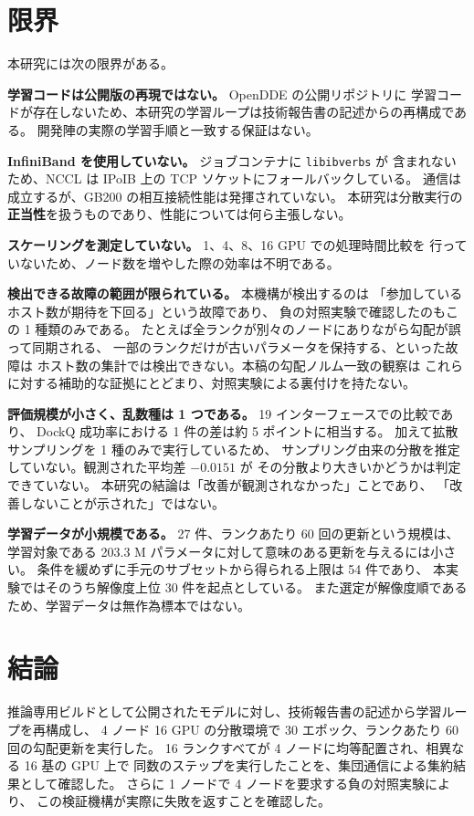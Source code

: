 \documentclass[11pt,a4paper]{article}
\begin{document}
\section{限界}

本研究には次の限界がある。

\textbf{学習コードは公開版の再現ではない。} OpenDDE の公開リポジトリに
学習コードが存在しないため、本研究の学習ループは技術報告書の記述からの再構成である。
開発陣の実際の学習手順と一致する保証はない。

\textbf{InfiniBand を使用していない。} ジョブコンテナに \texttt{libibverbs} が
含まれないため、NCCL は IPoIB 上の TCP ソケットにフォールバックしている。
通信は成立するが、GB200 の相互接続性能は発揮されていない。
本研究は分散実行の\textbf{正当性}を扱うものであり、性能については何ら主張しない。

\textbf{スケーリングを測定していない。} 1、4、8、16 GPU での処理時間比較を
行っていないため、ノード数を増やした際の効率は不明である。

\textbf{検出できる故障の範囲が限られている。} 本機構が検出するのは
「参加しているホスト数が期待を下回る」という故障であり、
負の対照実験で確認したのもこの 1 種類のみである。
たとえば全ランクが別々のノードにありながら勾配が誤って同期される、
一部のランクだけが古いパラメータを保持する、といった故障は
ホスト数の集計では検出できない。本稿の勾配ノルム一致の観察は
これらに対する補助的な証拠にとどまり、対照実験による裏付けを持たない。

\textbf{評価規模が小さく、乱数種は 1 つである。} 19 インターフェースでの比較であり、
DockQ 成功率における 1 件の差は約 5 ポイントに相当する。
加えて拡散サンプリングを 1 種のみで実行しているため、
サンプリング由来の分散を推定していない。観測された平均差 $-0.0151$ が
その分散より大きいかどうかは判定できていない。
本研究の結論は「改善が観測されなかった」ことであり、
「改善しないことが示された」ではない。

\textbf{学習データが小規模である。} 27 件、ランクあたり 60 回の更新という規模は、
学習対象である 203.3 M パラメータに対して意味のある更新を与えるには小さい。
条件を緩めずに手元のサブセットから得られる上限は 54 件であり、
本実験ではそのうち解像度上位 30 件を起点としている。
また選定が解像度順であるため、学習データは無作為標本ではない。

\section{結論}

推論専用ビルドとして公開されたモデルに対し、技術報告書の記述から学習ループを再構成し、
4 ノード 16 GPU の分散環境で 30 エポック、ランクあたり 60 回の勾配更新を実行した。
16 ランクすべてが 4 ノードに均等配置され、相異なる 16 基の GPU 上で
同数のステップを実行したことを、集団通信による集約結果として確認した。
さらに 1 ノードで 4 ノードを要求する負の対照実験により、
この検証機構が実際に失敗を返すことを確認した。
\end{document}
